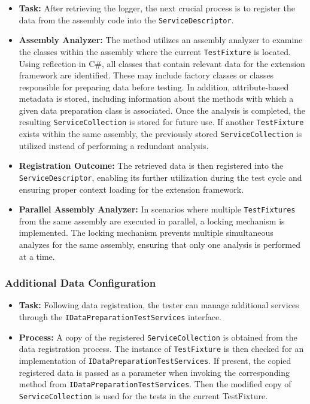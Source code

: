 \begin{itemize}
    \item \textbf{Task:}  
    After retrieving the logger, the next crucial process is to register the data from the assembly code into the \texttt{ServiceDescriptor}.
    
    \item \textbf{Assembly Analyzer:}  
    The method utilizes an assembly analyzer to examine the classes within the assembly where the current \texttt{TestFixture} is located. Using reflection in C\#, all classes that contain relevant data for the extension framework are identified. These may include factory classes or classes responsible for preparing data before testing. In addition, attribute-based metadata is stored, including information about the methods with which a given data preparation class is associated. Once the analysis is completed, the resulting \texttt{ServiceCollection} is stored for future use. If another \texttt{TestFixture} exists within the same assembly, the previously stored \texttt{ServiceCollection} is utilized instead of performing a redundant analysis.  

    \item \textbf{Registration Outcome:}  
    The retrieved data is then registered into the \texttt{ServiceDescriptor}, enabling its further utilization during the test cycle and ensuring proper context loading for the extension framework.
    
    \item \textbf{Parallel Assembly Analyzer:} 
    In scenarios where multiple \texttt{TestFixtures} from the same assembly are executed in parallel, a locking mechanism is implemented. The locking mechanism prevents multiple simultaneous analyzes for the same assembly, ensuring that only one analysis is performed at a time.
\end{itemize}

\subsubsection{Additional Data Configuration}


\begin{itemize}
    \item \textbf{Task:}  
    Following data registration, the tester can manage additional services through the \texttt{IDataPreparationTestServices} interface.
    
    \item \textbf{Process:}  
    A copy of the registered \texttt{ServiceCollection} is obtained from the data registration process. The instance of \texttt{TestFixture} is then checked for an implementation of \texttt{IDataPreparationTestServices}. If present, the copied registered data is passed as a parameter when invoking the corresponding method from \texttt{IDataPreparationTestServices}.
    Then the modified copy of \texttt{ServiceCollection} is used for the tests in the current TestFixture.
\end{itemize}

